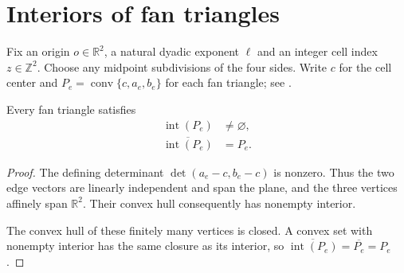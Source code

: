 \section{Interiors of fan triangles}
\label{sec:area_law_fan_regularity}

Fix an origin $o\in\mathbb R^2$, a natural dyadic exponent $\ell$
and an integer cell index $z\in\mathbb Z^2$. Choose any midpoint
subdivisions of the four sides. Write $c$ for the cell center and
$P_e=\operatorname{conv}\{c,a_e,b_e\}$ for each fan triangle;
see \cite[Section~11]{OpenAI2026AreaLaw}.


\begin{lemma}
    \label{thm:area_law_cell_fan_regularity}
    \leanok
    Every fan triangle satisfies
    \begin{align}
        \operatorname{int}(P_e)            & \ne\varnothing, \\
        \overline{\operatorname{int}(P_e)} & =P_e.
    \end{align}
\end{lemma}
\begin{proof}\leanok
    The defining determinant $\det(a_e-c,b_e-c)$ is nonzero. Thus the
    two edge vectors are linearly independent and span the plane, and
    the three vertices affinely span $\mathbb R^2$. Their convex hull
    consequently has nonempty interior.

    The convex hull of these finitely many vertices is closed. A convex
    set with nonempty interior has the same closure as its interior,
    so $\overline{\operatorname{int}(P_e)}=\overline{P_e}=P_e$.
\end{proof}
